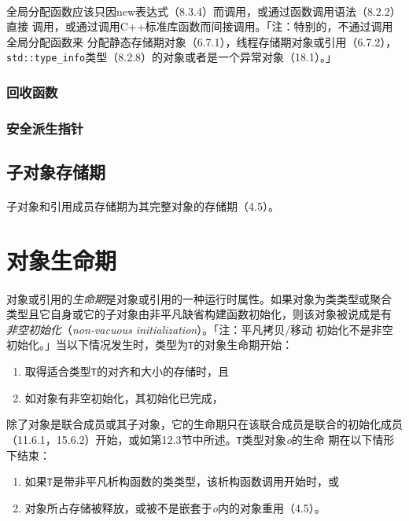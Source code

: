 \paragraph{}
全局分配函数应该只因new表达式（8.3.4）而调用，或通过函数调用语法（8.2.2）直接
调用，或通过调用C++标准库函数而间接调用。「注：特别的，不通过调用全局分配函数来
分配静态存储期对象（6.7.1），线程存储期对象或引用（6.7.2），
\texttt{std::type\_info}类型（8.2.8）的对象或者是一个异常对象（18.1）。」

\subsubsection{回收函数}
\subsubsection{安全派生指针}

\subsection{子对象存储期}
\paragraph{}
子对象和引用成员存储期为其完整对象的存储期（4.5）。

\section{对象生命期}
\paragraph{}
对象或引用的\textit{生命期}是对象或引用的一种运行时属性。如果对象为类类型或聚合
类型且它自身或它的子对象由非平凡缺省构建函数初始化，则该对象被说成是有
\textit{非空初始化}（\textit{non-vacuous initialization}）。「注：平凡拷贝/移动
初始化不是非空初始化。」当以下情况发生时，类型为\texttt{T}的对象生命期开始：
\begin{enumerate}
  \item{取得适合类型\texttt{T}的对齐和大小的存储时，且}
  \item{如对象有非空初始化，其初始化已完成，}
\end{enumerate}
除了对象是联合成员或其子对象，它的生命期只在该联合成员是联合的初始化成员
（11.6.1，15.6.2）开始，或如第12.3节中所述。\texttt{T}类型对象\textit{o}的生命
期在以下情形下结束：
\begin{enumerate}
  \item{如果\texttt{T}是带非平凡析构函数的类类型，该析构函数调用开始时，或}
  \item{对象所占存储被释放，或被不是嵌套于\textit{o}内的对象重用（4.5）。}
\end{enumerate}

